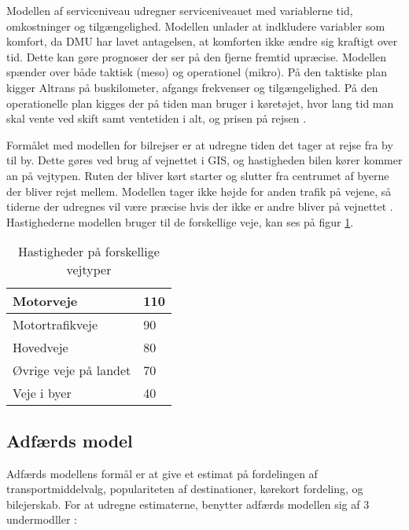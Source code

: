 \vspace{5mm}

Modellen af serviceniveau udregner serviceniveauet med variablerne tid, omkostninger og tilgængelighed. Modellen unlader at indkludere variabler som komfort, da DMU har lavet antagelsen, at komforten ikke ændre sig kraftigt over tid. Dette kan gøre prognoser der ser på den fjerne fremtid upræcise. Modellen spænder over både taktisk (meso) og operationel (mikro). På den taktiske plan kigger Altrans på buskilometer, afgangs frekvenser og tilgængelighed. På den operationelle plan kigges der på tiden man bruger i køretøjet, hvor lang tid man skal vente ved skift samt ventetiden i alt, og prisen på rejsen \cite[s. 36-37]{dmuadfaerdsmodel}.

\vspace{5mm}

Formålet med modellen for bilrejser er at udregne tiden det tager at rejse fra by til by. Dette gøres ved brug af vejnettet i GIS, og hastigheden bilen kører kommer an på vejtypen. Ruten der bliver kørt starter og slutter fra centrumet af byerne der bliver rejst mellem. Modellen tager ikke højde for anden trafik på vejene, så tiderne der udregnes vil være præcise hvis der ikke er andre bliver på vejnettet \cite[s. 25]{dmumodelanalyser}. Hastighederne modellen bruger til de forskellige veje, kan ses på figur \ref{altranshastigheder}.

\begin{table}[H]
\centering
\caption{Hastigheder på forskellige vejtyper}
\label{altranshastigheder}
\begin{tabular}{|l|l|}
\hline
Motorveje             & 110 \\ \hline
Motortrafikveje       & 90  \\ \hline
Hovedveje             & 80  \\ \hline
Øvrige veje på landet & 70  \\ \hline
Veje i byer           & 40  \\ \hline
\end{tabular}
\end{table}
\subsection{Adfærds model}
Adfærds modellens formål er at give et estimat på fordelingen af transportmiddelvalg, populariteten af destinationer, kørekort fordeling, og bilejerskab. For at udregne estimaterne, benytter adfærds modellen sig af 3 undermodller \cite[s. 25-26]{dmumodelanalyser}:

